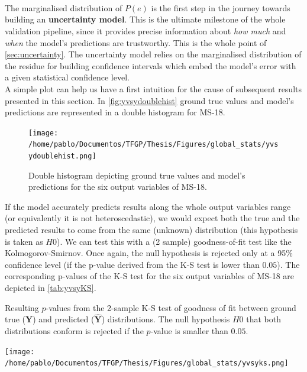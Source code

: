 \paragraph{ \\}
The marginalised distribution of $P(e)$ is the first step in the journey towards building an \textbf{uncertainty model}. This is the ultimate milestone of the whole validation pipeline, since it provides precise information about \textit{how much} and \textit{when} the model's predictions are trustworthy. This is the whole point of \autoref{sec:uncertainty}. The uncertainty model relies on the marginalised distribution of the residue for building confidence intervals which embed the model's error with a given statistical confidence level.\\
%
\indent A simple plot can help us have a first intuition for the cause of subsequent results presented in this section. In \autoref{fig:yvsydoublehist} ground true values and model's predictions are represented in a double histogram for MS-18.\\
\begin{figure}
	\centering
	\texttt{[image: /home/pablo/Documentos/TFGP/Thesis/Figures/global\_stats/yvsydoublehist.png]}
	\caption{Double histogram depicting ground true values and model's predictions for the six output variables of MS-18.}
	\label{fig:yvsydoublehist}
\end{figure}
%
\indent If the model accurately predicts results along the whole output variables range (or equivalently it is not heteroscedastic), we would expect both the true and the predicted results to come from the same (unknown) distribution (this hypothesis is taken as $H0$). We can test this with a (2 sample) goodness-of-fit test like the Kolmogorov-Smirnov. Once again, the null hypothesis is rejected only at a 95\% confidence level (\ie if the p-value derived from the K-S test is lower than $0.05$). The corresponding p-values of the K-S test for the six output variables of MS-18 are depicted in \autoref{tab:yvsyKS}.\\
\begin{table}
	\centering
	\caption{Resulting $p$-values from the 2-sample K-S test of goodness of fit between ground true ($\mathbf{Y}$) and predicted ($\mathbf{\hat{Y}}$) distributions. The null hypothesis $H0$ that both distributions conform is rejected if the $p$-value is smaller than $0.05$.}
	\texttt{[image: /home/pablo/Documentos/TFGP/Thesis/Figures/global\_stats/yvsyks.png]}
	\label{tab:yvsyKS}
\end{table}

